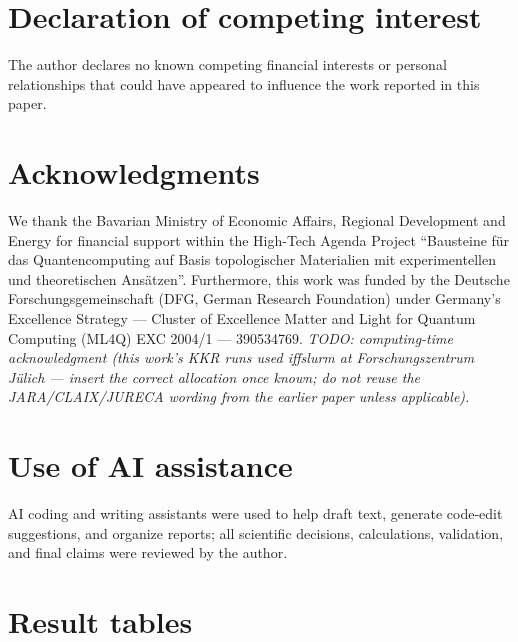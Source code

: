 \documentclass[11pt]{article}
\begin{document}
\section*{Declaration of competing interest}
The author declares no known competing financial interests or personal relationships that could have appeared
to influence the work reported in this paper.

\section*{Acknowledgments}
We thank the Bavarian Ministry of Economic Affairs, Regional Development and Energy for financial support within
the High-Tech Agenda Project ``Bausteine f\"ur das Quantencomputing auf Basis topologischer Materialien mit
experimentellen und theoretischen Ans\"atzen''. Furthermore, this work was funded by the Deutsche
Forschungsgemeinschaft (DFG, German Research Foundation) under Germany's Excellence Strategy --- Cluster of
Excellence Matter and Light for Quantum Computing (ML4Q) EXC 2004/1 --- 390534769.
\emph{TODO: computing-time acknowledgment (this work's KKR runs used iffslurm at Forschungszentrum J\"ulich ---
insert the correct allocation once known; do not reuse the JARA/CLAIX/JURECA wording from the earlier paper
unless applicable).}

\section*{Use of AI assistance}
AI coding and writing assistants were used to help draft text, generate code-edit suggestions, and organize
reports; all scientific decisions, calculations, validation, and final claims were reviewed by the author.

\appendix
\section{Result tables}
\label{app:tables}
\end{document}
